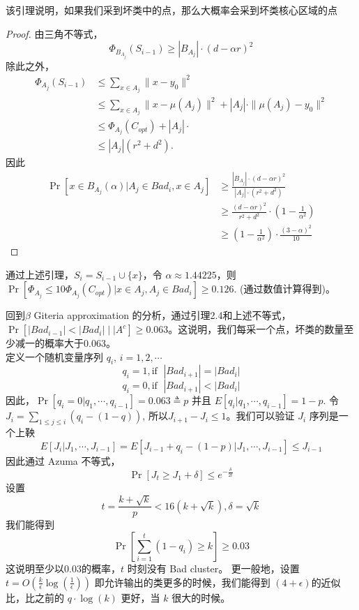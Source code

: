 \documentclass[lang=cn,newtx,10pt,scheme=chinese,chinesefont=nofont,citestyle=gb7714-2015, bibstyle=gb7714-2015]{elegantbook}
\begin{document}
\begin{refsection}
\begin{lemma}
\end{lemma}
该引理说明，如果我们采到坏类中的点，那么大概率会采到坏类核心区域的点
\begin{proof}由三角不等式，
    $$\Phi_{B_{A_{j}}}(S_{i-1})\ge |B_{A_{j}}|\cdot (d-\alpha r )^{2}$$ 
    除此之外，
    \begin{align*}
        \Phi_{A_{j}}(S_{i-1}) &\le \sum_{x\in A_{j}}\|x-y_{0}\|^{2} \\
        &\le \sum_{x\in A_{j}}\|x-\mu(A_{j})\|^{2}+|A_{j}|\cdot\|\mu(A_{j})-y_{0}\|^{2}\\
        &\le \Phi_{A_{j}}(C_{opt})+|A_{j}|\cdot\\
        &\le |A_{j}|(r^{2}+d^{2}).
    \end{align*}
因此\begin{align*}
    \Pr[x\in B_{A_{j}}(\alpha)|A_{j}\in Bad_{i},x\in A_{j}]&\ge \frac{|B_{A_{j}}|\cdot(d-\alpha r)^{2}}{|A_{j}|\cdot (r^{2}+d^{2})}\\
    &\ge \frac{(d-\alpha r)^{2}}{r^{2}+d^{2}}\cdot(1-\frac{1}{\alpha^{2}})\\
    &\ge (1 - \frac{1}{\alpha^{2}})\cdot \frac{(3-\alpha)^{2}}{10}
\end{align*}
\end{proof}

通过上述引理，$S_{i}=S_{i-1}\cup \{x\}$，令 $\alpha\approx 1.44225$，则$\Pr[\Phi_{A_{j}}\le 10\Phi_{A_{j}}(C_{opt})|x\in A_{j}, A_{j}\in Bad_{i}]\ge 0.126$. (通过数值计算得到)。

回到$\beta$ Giteria approximation 的分析，通过引理2.4和上述不等式， $\Pr[|Bad_{i-1}|<|Bad_{i}|\mid|A^{c}]\ge 0.063$。这说明，我们每采一个点，坏类的数量至少减一的概率大于0.063。\\
定义一个随机变量序列 $q_{i}$, $i=1,2,\cdots$ \[q_{i}=1, \text{if }\; |Bad_{i+1}|=|Bad_{i}|\] \[q_{i}=0, \text{if }\; |Bad_{i+1}| < |Bad_{i}|\]
因此，$\Pr[q_{i}=0|q_{1},\cdots,q_{i-1}]=0.063\triangleq p$ 并且 $E[q_{i}|q_{1},\cdots,q_{i-1}]=1-p$. 令 $J_{i}=\sum_{1\le j\le i}(q_{i}-(1-q))$, 所以$J_{i+1}-J_{i}\le 1$。我们可以验证 $J_{i}$ 序列是一个上鞅 $$E[J_{i}|J_{1},\cdots, J_{i-1}]=E[J_{i-1}+q_{i}-(1-p)|J_{1},\cdots, J_{i-1}]\le J_{i-1}$$
因此通过 Azuma 不等式，\[\Pr[J_{t}\ge J_{1}+\delta]\le e^{-\frac{\delta}{2t}}\]
设置 \[t=\frac{k+\sqrt{k}}{p}<16(k+\sqrt{k}), \delta=\sqrt{k}\] 我们能得到
\[\Pr[\sum_{i=1}^{t}(1-q_{i})\ge k]\ge 0.03\] 
这说明至少以0.03的概率，$t$ 时刻没有 Bad cluster。 更一般地，设置 $t=O(\frac{k}{\epsilon}\log (\frac{1}{\epsilon}))$ 即允许输出的类更多的时候，我们能得到 $(4+\epsilon)$的近似比，比之前的 $q\cdot \log(k)$ 更好，当 $k$ 很大的时候。

\end{refsection}
\end{document}
